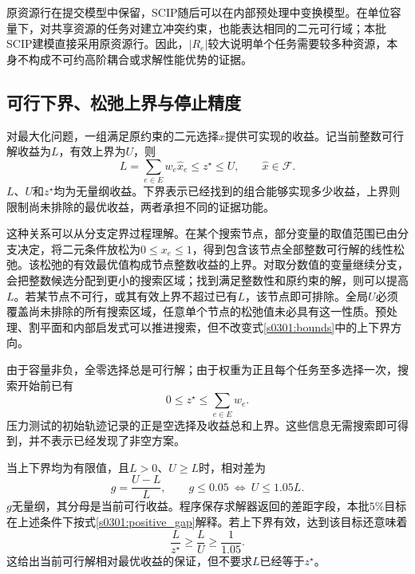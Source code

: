 原资源行在提交模型中保留，SCIP随后可以在内部预处理中变换模型。在单位容量下，对共享资源的任务对建立冲突约束，也能表达相同的二元可行域；本批SCIP建模直接采用原资源行。因此，$|R_e|$较大说明单个任务需要较多种资源，本身不构成不可约高阶耦合或求解性能优势的证据。

\subsection{可行下界、松弛上界与停止精度}

对最大化问题，一组满足原约束的二元选择$\hat{x}$提供可实现的收益。记当前整数可行解收益为$L$，有效上界为$U$，则
\begin{equation}
 L=\sum_{e\in E}w_e\hat{x}_e
 \leq z^{\star}\leq U,
 \qquad \hat{x}\in\mathcal{F}.
\label{s0301:bounds}
\end{equation}
$L$、$U$和$z^{\star}$均为无量纲收益。下界表示已经找到的组合能够实现多少收益，上界则限制尚未排除的最优收益，两者承担不同的证据功能。

这种关系可以从分支定界过程理解。在某个搜索节点，部分变量的取值范围已由分支决定，将二元条件放松为$0\leq x_e\leq1$，得到包含该节点全部整数可行解的线性松弛。该松弛的有效最优值构成节点整数收益的上界。对取分数值的变量继续分支，会把整数候选分配到更小的搜索区域；找到满足整数性和原约束的解，则可以提高$L$。若某节点不可行，或其有效上界不超过已有$L$，该节点即可排除。全局$U$必须覆盖尚未排除的所有搜索区域，任意单个节点的松弛值未必具有这一性质。预处理、割平面和内部启发式可以推进搜索，但不改变式\eqref{s0301:bounds}中的上下界方向。

由于容量非负，全零选择总是可行解；由于权重为正且每个任务至多选择一次，搜索开始前已有
\begin{equation}
 0\leq z^{\star}\leq\sum_{e\in E}w_e.
\label{s0301:trivial_bounds}
\end{equation}
压力测试的初始轨迹记录的正是空选择及收益总和上界。这些信息无需搜索即可得到，并不表示已经发现了非空方案。

当上下界均为有限值，且$L>0$、$U\geq L$时，相对差为
\begin{equation}
 g=\frac{U-L}{L},\qquad
 g\leq0.05\ \Longleftrightarrow\ U\leq1.05L.
\label{s0301:positive_gap}
\end{equation}
$g$无量纲，其分母是当前可行收益。程序保存求解器返回的差距字段，本批$5\%$目标在上述条件下按式\eqref{s0301:positive_gap}解释。若上下界有效，达到该目标还意味着
\begin{equation}
 \frac{L}{z^{\star}}\geq\frac{L}{U}\geq\frac{1}{1.05}.
\label{s0301:gap_implication}
\end{equation}
这给出当前可行解相对最优收益的保证，但不要求$L$已经等于$z^{\star}$。

